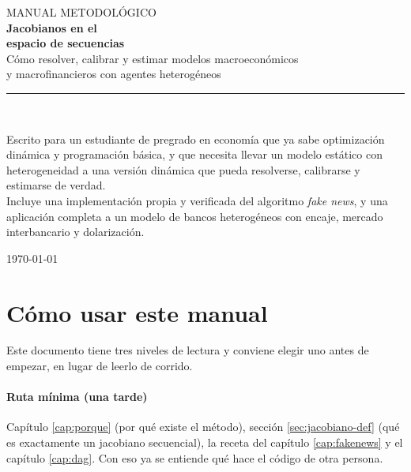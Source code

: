 \thispagestyle{empty}
\begin{center}
\vspace*{2.2cm}
{\sffamily\color{azul}\large MANUAL METODOLÓGICO}\\[1.6cm]
{\sffamily\bfseries\fontsize{30}{36}\selectfont\color{tinta}
Jacobianos en el\\[2pt] espacio de secuencias}\\[0.9cm]
{\sffamily\large\color{tinta2}
Cómo resolver, calibrar y estimar modelos macroeconómicos\\[2pt]
y macrofinancieros con agentes heterogéneos}\\[2.4cm]

{\color{gris}\rule{0.55\textwidth}{1.2pt}}\\[1.1cm]

\begin{minipage}{0.80\textwidth}\centering\small\color{tinta2}
Escrito para un estudiante de pregrado en economía que ya sabe optimización
dinámica y programación básica, y que necesita llevar un modelo estático con
heterogeneidad a una versión dinámica que pueda resolverse, calibrarse y
estimarse de verdad.\\[0.7em]
Incluye una implementación propia y verificada del algoritmo \emph{fake news},
y una aplicación completa a un modelo de bancos heterogéneos con encaje,
mercado interbancario y dolarización.
\end{minipage}

\vfill
{\small\color{tinta2}\today}
\end{center}
\clearpage

\thispagestyle{empty}
\section*{Cómo usar este manual}

Este documento tiene tres niveles de lectura y conviene elegir uno antes de
empezar, en lugar de leerlo de corrido.

\paragraph{Ruta mínima (una tarde)} Capítulo \ref{cap:porque} (por qué existe
el método), sección \ref{sec:jacobiano-def} (qué es exactamente un jacobiano
secuencial), la receta del capítulo \ref{cap:fakenews} y el capítulo
\ref{cap:dag}. Con eso ya se entiende qué hace el código de otra persona.

